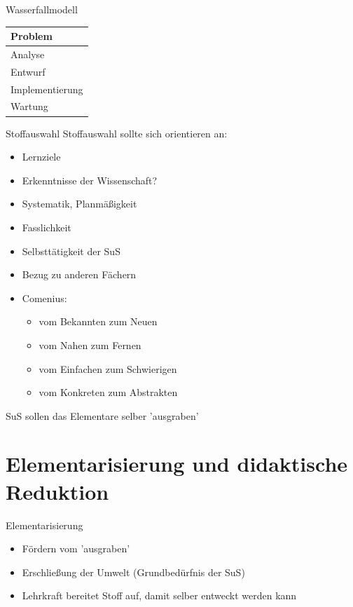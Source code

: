 \documentclass{article}
\begin{document}
\begin{block}{Wasserfallmodell}
    \centering
    \begin{tabular}{|p{10cm}|}
            \hline
            Problem \\
            \hline
            Analyse \\
            \hline
            Entwurf \\
            \hline
            Implementierung \\
            \hline
            Wartung \\
            \hline
        \end{tabular}
\end{block}

\begin{block}{Stoffauswahl}
    Stoffauswahl sollte sich orientieren an:
    \begin{itemize}
        \item Lernziele
        \item Erkenntnisse der Wissenschaft?
        \item Systematik, Planmäßigkeit
        \item Fasslichkeit
        \item Selbsttätigkeit der SuS
        \item Bezug zu anderen Fächern
        \item Comenius:
        \begin{itemize}
            \item vom Bekannten zum Neuen
            \item vom Nahen zum Fernen
            \item vom Einfachen zum Schwierigen
            \item vom Konkreten zum Abstrakten
        \end{itemize}
    \end{itemize}
    SuS sollen das Elementare selber 'ausgraben'
\end{block}

\section{Elementarisierung und didaktische Reduktion}
\begin{block}{Elementarisierung}
    \begin{itemize}
        \item Fördern vom 'ausgraben'
        \item Erschließung der Umwelt (Grundbedürfnis der SuS)
        \item Lehrkraft bereitet Stoff auf, damit selber entweckt werden kann
    \end{itemize}
\end{block}
\end{document}
